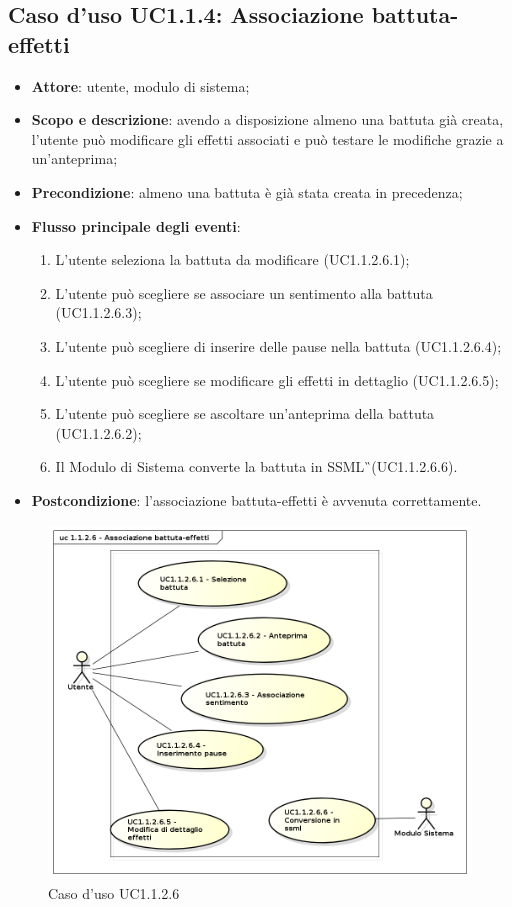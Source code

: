\subsection{Caso d'uso UC1.1.4: Associazione battuta-effetti}
\label{sec:UC1.1.4}

\begin{itemize}
\item \textbf{Attore}: utente, modulo di sistema;
\item \textbf{Scopo e descrizione}: avendo a disposizione almeno una battuta già creata, l'utente può modificare gli effetti associati e può testare le modifiche grazie a un'anteprima; 
\item \textbf{Precondizione}: almeno una battuta è già stata creata in precedenza;
\item \textbf{Flusso principale degli eventi}:
\begin{enumerate}
\item L'utente seleziona la battuta da modificare (UC1.1.2.6.1);
\item L'utente può scegliere se associare un sentimento alla battuta (UC1.1.2.6.3);
\item L'utente può scegliere di inserire delle pause nella battuta (UC1.1.2.6.4);
\item L'utente può scegliere se modificare gli effetti in dettaglio (UC1.1.2.6.5);
\item L'utente può scegliere se ascoltare un'anteprima della battuta (UC1.1.2.6.2);
\item Il Modulo di Sistema converte la battuta in SSML\G\ (UC1.1.2.6.6).
\end{enumerate}
\item \textbf{Postcondizione}: l'associazione battuta-effetti è avvenuta correttamente.
\end{itemize}
\begin{figure}[htbp]
\centering
\includegraphics[scale=0.5]{immagini/uc1_1_2_6_associazione_battuta_effetti.png}
\captionsetup{labelfont=bf}
\caption{Caso d'uso UC1.1.2.6}
\end{figure}
\newpage

